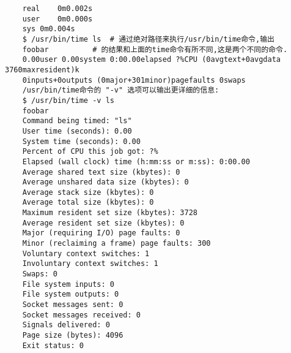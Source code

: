 \documentclass[draft,openany]{book}
\begin{document}
\begin{CJK}{UTF8}{gbsn}
\begin{verbatim}
    real    0m0.002s
    user    0m0.000s
    sys 0m0.004s
    $ /usr/bin/time ls  # 通过绝对路径来执行/usr/bin/time命令,输出
    foobar          # 的结果和上面的time命令有所不同,这是两个不同的命令.
    0.00user 0.00system 0:00.00elapsed ?%CPU (0avgtext+0avgdata 3760maxresident)k
    0inputs+0outputs (0major+301minor)pagefaults 0swaps
    /usr/bin/time命令的 "-v" 选项可以输出更详细的信息:
    $ /usr/bin/time -v ls
    foobar
    Command being timed: "ls"
    User time (seconds): 0.00
    System time (seconds): 0.00
    Percent of CPU this job got: ?%
    Elapsed (wall clock) time (h:mm:ss or m:ss): 0:00.00
    Average shared text size (kbytes): 0
    Average unshared data size (kbytes): 0
    Average stack size (kbytes): 0
    Average total size (kbytes): 0
    Maximum resident set size (kbytes): 3728
    Average resident set size (kbytes): 0
    Major (requiring I/O) page faults: 0
    Minor (reclaiming a frame) page faults: 300
    Voluntary context switches: 1
    Involuntary context switches: 1
    Swaps: 0
    File system inputs: 0
    File system outputs: 0
    Socket messages sent: 0
    Socket messages received: 0
    Signals delivered: 0
    Page size (bytes): 4096
    Exit status: 0
    \end{verbatim}


\end{CJK}
\end{document}
